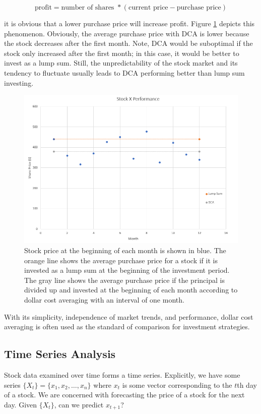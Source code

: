 \documentclass[12pt]{article}
\begin{document}
$$\text{profit} = \text{number of shares } *( \text{current price} - \text{purchase price} )$$

it is obvious that a lower purchase price will increase profit. Figure \ref{dca} depicts this phenomenon. Obviously, the average purchase price with DCA is lower because the stock decreases after the first month. Note, DCA would be suboptimal if the stock only increased after the first month; in this case, it would be better to invest as a lump sum. Still, the unpredictability of the stock market and its tendency to fluctuate usually leads to DCA performing better than lump sum investing.

\begin{figure}[ht]
	\centering
	\includegraphics[width=.7\textwidth]{dca.png}
	\caption{Stock price at the beginning of each month is shown in blue. The orange line shows the average purchase price for a stock if it is invested as a lump sum at the beginning of the investment period. The gray line shows the average purchase price if the principal is divided up and invested at the beginning of each month according to dollar cost averaging with an interval of one month. \cite{dca}}
	\label{dca}
\end{figure}

With its simplicity, independence of market trends, and performance, dollar cost averaging is often used as the standard of comparison for investment strategies.

\subsection{Time Series Analysis}
Stock data examined over time forms a time series. Explicitly, we have some series $\{X_t\} = \{x_1, x_2, \dots, x_n\}$ where $x_t$ is some vector corresponding to the $t$th day of a stock. We are concerned with forecasting the price of a stock for the next day. Given $\{X_t\}$, can we predict $x_{t+1}$?
\end{document}
